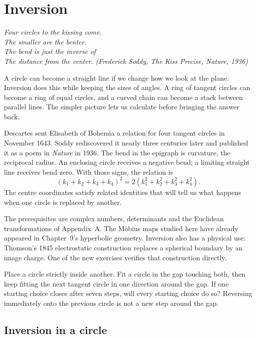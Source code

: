 \chapter{Inversion}\label{geometry:ch:inversion}

\begin{center}\itshape
Four circles to the kissing come.\\
The smaller are the benter.\\
The bend is just the inverse of\\
The distance from the center.
\upshape(Frederick Soddy, \emph{The Kiss Precise}, Nature, 1936)
\end{center}

A circle can become a straight line if we change how we look at the plane. Inversion does this while keeping the sizes of angles. A ring of tangent circles can become a ring of equal circles, and a curved chain can become a stack between parallel lines. The simpler picture lets us calculate before bringing the answer back.

Descartes sent Elisabeth of Bohemia a relation for four tangent circles in November 1643. Soddy rediscovered it nearly three centuries later and published it as a poem in \emph{Nature} in 1936. The bend in the epigraph is curvature, the reciprocal radius. An enclosing circle receives a negative bend; a limiting straight line receives bend zero. With those signs, the relation is
\[
(k_1+k_2+k_3+k_4)^2=2(k_1^2+k_2^2+k_3^2+k_4^2).
\]
The centre coordinates satisfy related identities that will tell us what happens when one circle is replaced by another.

The prerequisites are complex numbers, determinants and the Euclidean transformations of Appendix~A. The M\"obius maps studied here have already appeared in Chapter~9's hyperbolic geometry. Inversion also has a physical use: Thomson's 1845 electrostatic construction replaces a spherical boundary by an image charge. One of the new exercises verifies that construction directly.

\begin{think}
Place a circle strictly inside another. Fit a circle in the gap touching both, then keep fitting the next tangent circle in one direction around the gap. If one starting choice closes after seven steps, will every starting choice do so? Reversing immediately onto the previous circle is not a new step around the gap.
\end{think}

\section{Inversion in a circle}

